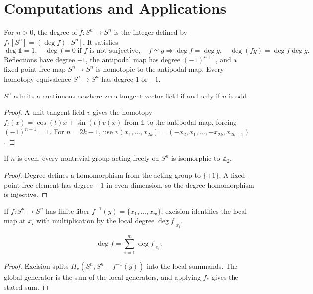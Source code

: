 \section{Computations and Applications}

For $n>0$, the degree of $f:S^n\to S^n$ is the integer defined by $f_*[S^n]=(\deg f)[S^n]$.  It satisfies
\[
\deg\mathbb{1}=1,\quad \deg f=0\text{ if }f\text{ is not surjective},\quad f\simeq g\Rightarrow\deg f=\deg g,\quad \deg(fg)=\deg f\deg g.
\]
Reflections have degree $-1$, the antipodal map has degree $(-1)^{n+1}$, and a fixed-point-free map $S^n\to S^n$ is homotopic to the antipodal map.
Every homotopy equivalence $S^n\to S^n$ has degree $1$ or $-1$.

\begin{theorem}
\label{thm:tangent-vector-fields-spheres}
$S^n$ admits a continuous nowhere-zero tangent vector field if and only if $n$ is odd.
\end{theorem}
\begin{proof}
\sketch A unit tangent field $v$ gives the homotopy $f_t(x)=\cos(t)x+\sin(t)v(x)$ from $\mathbb{1}$ to the antipodal map, forcing $(-1)^{n+1}=1$.  For $n=2k-1$, use $v(x_1,\ldots,x_{2k})=(-x_2,x_1,\ldots,-x_{2k},x_{2k-1})$.
\end{proof}

\begin{proposition}
\label{prop:z2-acts-freely-even-spheres}
If $n$ is even, every nontrivial group acting freely on $S^n$ is isomorphic to $\mathbb{Z}_2$.
\end{proposition}
\begin{proof}
\sketch Degree defines a homomorphism from the acting group to $\{\pm1\}$.  A fixed-point-free element has degree $-1$ in even dimension, so the degree homomorphism is injective.
\end{proof}

If $f:S^n\to S^n$ has finite fiber $f^{-1}(y)=\{x_1,\ldots,x_m\}$, excision identifies the local map at $x_i$ with multiplication by the local degree $\deg f|_{x_i}$.

\begin{proposition}
\label{prop:local-degree-formula}
\[
\deg f=\sum_{i=1}^m\deg f|_{x_i}.
\]
\end{proposition}
\begin{proof}
\sketch Excision splits $H_n(S^n,S^n-f^{-1}(y))$ into the local summands.  The global generator is the sum of the local generators, and applying $f_*$ gives the stated sum.
\end{proof}

